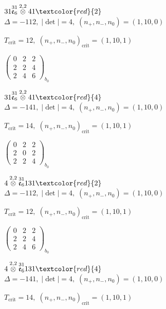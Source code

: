 \documentclass[10pt]{article}
\begin{document}
\smallskip

$31\overset{31}{\mathfrak{e}_6}\overset{2,2}{\otimes}41\textcolor{red}{2}$ \quad $\Delta=-112,\; |\det|=4,\; (n_+,n_-,n_0)=(1,10,0)$

\hspace{1em}$T_{\text{crit}}=12,\; (n_+,n_-,n_0)_{\text{crit}}=(1,10,1)$

\hspace{2em}$\left(\begin{smallmatrix}0 & 2 & 2 \\ 2 & 2 & 4 \\ 2 & 4 & 6\end{smallmatrix}\right)_{\!b_0}$

$31\overset{31}{\mathfrak{e}_6}\overset{2,2}{\otimes}41\textcolor{red}{4}$ \quad $\Delta=-141,\; |\det|=4,\; (n_+,n_-,n_0)=(1,10,0)$

\hspace{1em}$T_{\text{crit}}=14,\; (n_+,n_-,n_0)_{\text{crit}}=(1,10,1)$

\hspace{2em}$\left(\begin{smallmatrix}0 & 2 & 2 \\ 2 & 0 & 2 \\ 2 & 2 & 4\end{smallmatrix}\right)_{\!b_0}$

\smallskip

$4\overset{2,2}{\otimes}\overset{31}{\mathfrak{e}_6}131\textcolor{red}{2}$ \quad $\Delta=-112,\; |\det|=4,\; (n_+,n_-,n_0)=(1,10,0)$

\hspace{1em}$T_{\text{crit}}=12,\; (n_+,n_-,n_0)_{\text{crit}}=(1,10,1)$

\hspace{2em}$\left(\begin{smallmatrix}0 & 2 & 2 \\ 2 & 2 & 4 \\ 2 & 4 & 6\end{smallmatrix}\right)_{\!b_0}$

$4\overset{2,2}{\otimes}\overset{31}{\mathfrak{e}_6}131\textcolor{red}{4}$ \quad $\Delta=-141,\; |\det|=4,\; (n_+,n_-,n_0)=(1,10,0)$

\hspace{1em}$T_{\text{crit}}=14,\; (n_+,n_-,n_0)_{\text{crit}}=(1,10,1)$
\end{document}
